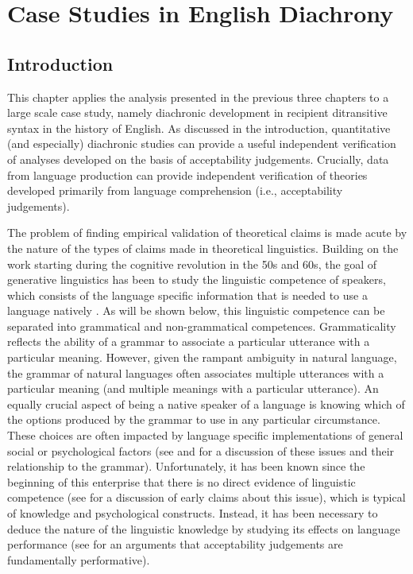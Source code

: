 \chapter{Case Studies in English Diachrony}\label{ch:diachron}
\section{Introduction}
This chapter applies the analysis presented in the previous three chapters to a large scale case study, namely diachronic development in recipient ditransitive syntax in the history of English. As discussed in the introduction, quantitative (and especially) diachronic studies can provide a useful independent verification of analyses developed on the basis of acceptability judgements. Crucially, data from language production can provide independent verification of theories developed primarily from language comprehension (i.e., acceptability judgements).

The problem of finding empirical validation of theoretical claims is made acute by the nature of the types of claims made in theoretical linguistics. Building on the work starting during the cognitive revolution in the 50s and 60s, the goal of generative linguistics has been to study the linguistic competence of speakers, which consists of the language specific information that is needed to use a language natively \citep{Chomsky.1981,Chomsky.1986}. As will be shown below, this linguistic competence can be separated into grammatical and non-grammatical competences. Grammaticality reflects the ability of a grammar to associate a particular utterance with a particular meaning. However, given the rampant ambiguity in natural language, the grammar of natural languages often associates multiple utterances with a particular meaning (and multiple meanings with a particular utterance). An equally crucial aspect of being a native speaker of a language is knowing which of the options produced by the grammar to use in any particular circumstance. These choices are often impacted by language specific implementations of general social or psychological factors (see \cite{Bresnan.2007,Bresnan.2010,Zeevat.2014} and \cite{Tamminga.2016} for a discussion of these issues and their relationship to the grammar). Unfortunately, it has been known since the beginning of this enterprise that there is no direct evidence of linguistic competence (see \cite{Schutze.1996} for a discussion of early claims about this issue), which is typical of knowledge and psychological constructs. Instead, it has been necessary to deduce the nature of the linguistic knowledge by studying its effects on language performance (see \citealt{Stroud.2012,Phillips.2013, Phillips.2013b, Phillips.2013c} for an arguments that acceptability judgements are fundamentally performative).

